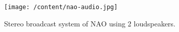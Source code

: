 \begin{figure}
	[h] \centering 
	\texttt{[image: /content/nao-audio.jpg]} \caption{Stereo broadcast system of NAO using 2 loudspeakers. \cite{8}} \label{fg:nao:audio} 
\end{figure}
